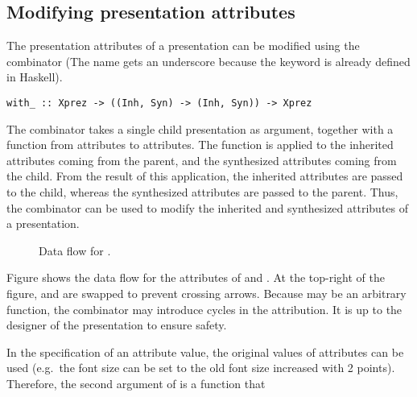 %																
\subsection{Modifying presentation attributes}

The presentation attributes of a presentation can be modified using the  combinator (The name gets an underscore because the keyword  is already defined in Haskell).

\begin{small}
\begin{verbatim}
with_ :: Xprez -> ((Inh, Syn) -> (Inh, Syn)) -> Xprez
\end{verbatim}
\end{small}

The combinator takes a single child presentation as argument, together with a function from attributes to attributes. The function is applied to the inherited attributes coming from the parent, and the synthesized attributes coming from the child. From the result of this application, the inherited attributes are passed to the child, whereas the synthesized attributes are passed to the parent. Thus, the  combinator can be used to modify the inherited and synthesized attributes of a presentation.

\begin{figure}[t]
\begin{center}
\caption{Data flow for .}\label{withDataFlow} 
\end{center}
\end{figure}


Figure shows the data flow for the attributes of  and . At the top-right of the figure,  and  are swapped to prevent crossing arrows. Because  may be an arbitrary function, the combinator may introduce cycles in the attribution. It is up to the designer of the presentation to ensure safety.

\bc \toHere
In the specification of an attribute value, the original values of attributes can be used (e.g.\ the font size can be set to the old font size increased with 2 points). Therefore, the second argument of  is a function that %
\fromHere \ec


